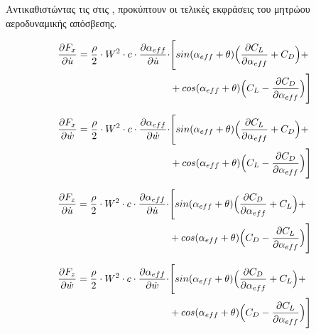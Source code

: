 \vspace{0.8cm}

Αντικαθιστώντας τις  στις , προκύπτουν οι τελικές εκφράσεις του μητρώου αεροδυναμικής απόσβεσης.

\begin{equation}
   \begin{aligned} 
   \dfrac{\partial F_x}{\partial \dot{u}} = \dfrac{\rho}{2}\cdot W^2 \cdot c \cdot \dfrac{\partial \alpha_{eff}}{\partial \dot{u}} \cdot & \Bigg[sin(\alpha_{eff}+\theta)\Big(\dfrac{\partial C_L}{\partial \alpha_{eff}}+C_D\Big) + \\
   &+ cos(\alpha_{eff}+\theta)\Big(C_L-\dfrac{\partial C_D}{\partial \alpha_{eff}}\Big)\Bigg]
   \end{aligned} 
    \label{eq:Fxu}
\end{equation}

\begin{equation}
   \begin{aligned} 
   \dfrac{\partial F_x}{\partial \dot{w}} = \dfrac{\rho}{2}\cdot W^2 \cdot c \cdot \dfrac{\partial \alpha_{eff}}{\partial \dot{w}} \cdot & \Bigg[sin(\alpha_{eff}+\theta)\Big(\dfrac{\partial C_L}{\partial \alpha_{eff}}+C_D\Big) + \\
   &+ cos(\alpha_{eff}+\theta)\Big(C_L-\dfrac{\partial C_D}{\partial \alpha_{eff}}\Big)\Bigg]
   \end{aligned} 
    \label{eq:Fxw}
\end{equation}

\vspace{0.6cm}

\begin{equation}
   \begin{aligned} 
   \dfrac{\partial F_z}{\partial \dot{u}} = \dfrac{\rho}{2}\cdot W^2 \cdot c \cdot \dfrac{\partial \alpha_{eff}}{\partial \dot{u}} \cdot & \Bigg[sin(\alpha_{eff}+\theta)\Big(\dfrac{\partial C_D}{\partial \alpha_{eff}}+C_L\Big) + \\
   &+ cos(\alpha_{eff}+\theta)\Big(C_D-\dfrac{\partial C_L}{\partial \alpha_{eff}}\Big)\Bigg]
   \end{aligned} 
    \label{eq:Fzu}
\end{equation}

\begin{equation}
   \begin{aligned} 
   \dfrac{\partial F_z}{\partial \dot{w}} = \dfrac{\rho}{2}\cdot W^2 \cdot c \cdot \dfrac{\partial \alpha_{eff}}{\partial \dot{w}} \cdot & \Bigg[sin(\alpha_{eff}+\theta)\Big(\dfrac{\partial C_D}{\partial \alpha_{eff}}+C_L\Big) + \\
   &+ cos(\alpha_{eff}+\theta)\Big(C_D-\dfrac{\partial C_L}{\partial \alpha_{eff}}\Big)\Bigg]
   \end{aligned} 
    \label{eq:Fzw}
\end{equation}

